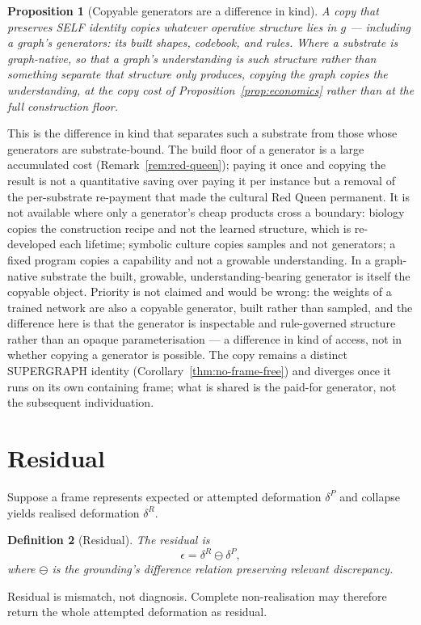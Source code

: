 \documentclass[11pt,a4paper]{article}
\newtheorem{definition}{Definition}[section]
\newtheorem{proposition}[definition]{Proposition}
\theoremstyle{remark}\newtheorem{remark}[definition]{Remark}
\begin{document}
\begin{proposition}[Copyable generators are a difference in kind]\label{prop:copyable-generators}
A copy that preserves SELF identity copies whatever operative structure lies in $g$ --- including a graph's \emph{generators}: its built shapes, codebook, and rules. Where a substrate is graph-native, so that a graph's understanding \emph{is} such structure rather than something separate that structure only produces, copying the graph copies the understanding, at the copy cost of Proposition~\ref{prop:economics} rather than at the full construction floor.
\end{proposition}
This is the difference in kind that separates such a substrate from those whose generators are substrate-bound. The build floor of a generator is a large accumulated cost (Remark~\ref{rem:red-queen}); paying it once and copying the result is not a quantitative saving over paying it per instance but a removal of the per-substrate re-payment that made the cultural Red Queen permanent. It is not available where only a generator's cheap products cross a boundary: biology copies the construction recipe and not the learned structure, which is re-developed each lifetime; symbolic culture copies samples and not generators; a fixed program copies a capability and not a growable understanding. In a graph-native substrate the built, growable, understanding-bearing generator
is itself the copyable object. Priority is not claimed and would be wrong: the weights of a trained
network are also a copyable generator, built rather than sampled, and the difference here is that the
generator is inspectable and rule-governed structure rather than an opaque parameterisation --- a
difference in kind of access, not in whether copying a generator is possible. The copy remains a distinct SUPERGRAPH identity (Corollary~\ref{thm:no-frame-free}) and diverges once it runs on its own containing frame; what is shared is the paid-for generator, not the subsequent individuation.

\section{Residual}\label{sec:residual}
Suppose a frame represents expected or attempted deformation $\delta^P$ and collapse yields realised deformation $\delta^R$.
\begin{definition}[Residual]\label{def:residual}
The residual is
\[\boxed{\epsilon=\delta^R\ominus\delta^P,}\]
where $\ominus$ is the grounding's difference relation preserving relevant discrepancy.
\end{definition}
Residual is mismatch, not diagnosis. Complete non-realisation may therefore return the whole attempted deformation as residual.
\end{document}
